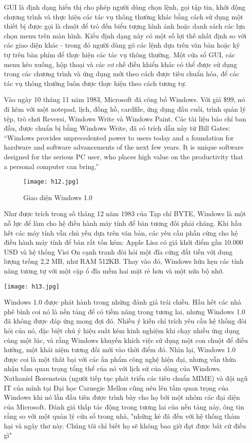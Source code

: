 \documentclass[12pt,a4paper]{article}  %
\begin{document}
\noindent GUI là định dạng hiển thị cho phép người dùng chọn lệnh, gọi tập tin, khởi động chương trình và thực hiện các tác vụ thông thường khác bằng cách sử dụng một thiết bị được gọi là chuột để trỏ đến biểu tượng hình ảnh hoặc danh sách các lựa chọn menu trên màn hình. Kiểu định dạng này có một số lợi thế nhất định so với các giao diện khác - trong đó người dùng gõ các lệnh dựa trên văn bản hoặc ký tự trên bàn phím để thực hiện các tác vụ thông thường. Một cửa sổ GUI, các menu kéo xuống, hộp thoại và các cơ chế điều khiển khác có thể được sử dụng trong các chương trình và ứng dụng mới theo cách được tiêu chuẩn hóa, để các tác vụ thông thường luôn được thực hiện theo cách tương tự. 

\noindent Vào ngày 10 tháng 11 năm 1983, Microsoft đã công bố Windows. Với giá \(\$ \)99, nó đi kèm với một notepad, lịch, đồng hồ, cardfile, ứng dụng đầu cuối, trình quản lý tệp, trò chơi Reversi, Windows Write và Windows Paint. Các tài liệu báo chí ban đầu, được chuẩn bị bằng Windows Write, đã có trích dẫn này từ Bill Gates: \enquote{Windows provides unprecedented power to users today and a foundation for hardware and software advancements of the next few years. It is unique software designed for the serious PC user, who places high value on the productivity that a personal computer can bring.}

\begin{figure}[!h]
	\centering
	\texttt{[image: h12.jpg]}
	\captionsetup{labelformat=empty}
	\caption{Giao diện Windows 1.0}
\end{figure}
\noindent Như được trích trong số tháng 12 năm 1983 của Tạp chí BYTE, Windows là một nỗ lực để làm cho hệ điều hành máy tính để bàn tương đối phải chăng. Khi hầu hết các máy tính vẫn chủ yếu dựa trên văn bản, các yêu cầu phần cứng cho hệ điều hành máy tính để bàn rất tốn kém: Apple Lisa có giá khởi điểm gần 10.000 USD và hệ thống Visi On cạnh tranh đòi hỏi một đĩa cứng đắt tiền với dung lượng trống 2,2 MB, như RAM 512KB. Thay vào đó, Windows hứa hẹn các tính năng tương tự với một cặp ổ đĩa mềm hai mặt rẻ hơn và một nửa bộ nhớ.
\begin{center}
	\texttt{[image: h13.jpg]}
\end{center}
Windows 1.0 được phát hành trong những đánh giá trái chiều. Hầu hết các nhà phê bình coi nó là nền tảng để có tiềm năng trong tương lai, nhưng Windows 1.0 đã không được đáp ứng mong đợi đó. Nhiều ý kiến chỉ trích yêu cầu hệ thống đòi hỏi của nó, đặc biệt chú ý hiệu suất kém kinh nghiệm khi chạy nhiều ứng dụng cùng một lúc, và rằng Windows khuyến khích việc sử dụng một con chuột để điều hướng, một khái niệm tương đối mới vào thời điểm đó. Nhìn lại, Windows 1.0 được coi là một thất bại với các ấn phẩm công nghệ hiện đại, nhưng vẫn thừa nhận tầm quan trọng tổng thể của nó với lịch sử của dòng của Windows. Nathaniel Borenstein (người tiếp tục phát triển các tiêu chuẩn MIME) và đội ngũ IT của mình tại Đại học Carnegie Mellon cũng nêu lên tầm quan trọng của Windows khi nó lần đầu tiên được trình bày cho họ bởi một nhóm các đại diện của Microsoft. Đánh giá thấp tác động trong tương lai của nền tảng này, ông tin rằng so với một quản lý cửa sổ trong nhà, "những kẻ đã đến với hệ thống thảm hại và ngây thơ này. Chúng tôi chỉ biết họ sẽ không bao giờ đạt được bất cứ điều gì"
\end{document}
